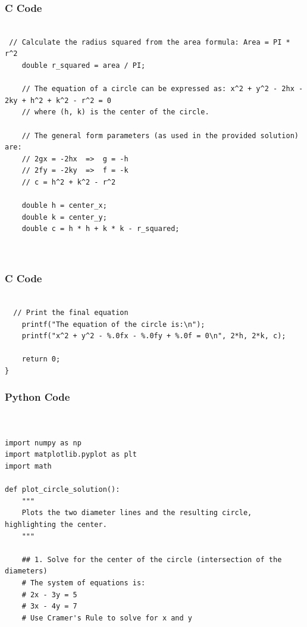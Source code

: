 \documentclass{beamer}
\begin{document}
\begin{frame}[fragile]
    \frametitle{C Code }
    \begin{lstlisting}

 // Calculate the radius squared from the area formula: Area = PI * r^2
    double r_squared = area / PI;
    
    // The equation of a circle can be expressed as: x^2 + y^2 - 2hx - 2ky + h^2 + k^2 - r^2 = 0
    // where (h, k) is the center of the circle.
    
    // The general form parameters (as used in the provided solution) are:
    // 2gx = -2hx  =>  g = -h
    // 2fy = -2ky  =>  f = -k
    // c = h^2 + k^2 - r^2
    
    double h = center_x;
    double k = center_y;
    double c = h * h + k * k - r_squared;

  
      \end{lstlisting}
\end{frame} 

\begin{frame}[fragile]
    \frametitle{C Code }
    \begin{lstlisting}

  // Print the final equation
    printf("The equation of the circle is:\n");
    printf("x^2 + y^2 - %.0fx - %.0fy + %.0f = 0\n", 2*h, 2*k, c);
    
    return 0;
}

      \end{lstlisting}
\end{frame} 

\begin{frame}[fragile]
    \frametitle{Python Code }
    \begin{lstlisting}


import numpy as np
import matplotlib.pyplot as plt
import math

def plot_circle_solution():
    """
    Plots the two diameter lines and the resulting circle, highlighting the center.
    """
    
    ## 1. Solve for the center of the circle (intersection of the diameters)
    # The system of equations is:
    # 2x - 3y = 5
    # 3x - 4y = 7
    # Use Cramer's Rule to solve for x and y
    
  
          \end{lstlisting}
\end{frame} 
\end{document}
